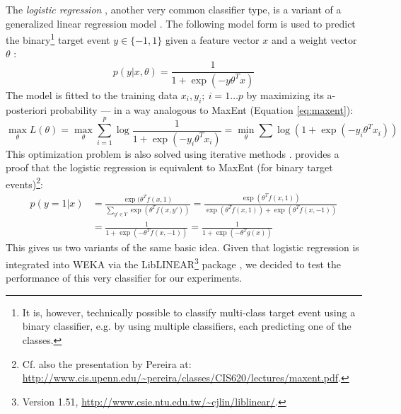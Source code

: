 \documentclass[12pt,notitlepage]{report}
\begin{document}
The \emph{logistic regression} \citep{hosmer00}, another very common classifier type, is a variant of a generalized linear regression model \citep{maccullagh91}. The following model form is used to predict the binary\footnote{It is, however, technically possible to classify multi-class target event using a binary classifier, e.g. by using multiple classifiers, each predicting one of the classes.} target event $y \in\{-1,1\}$ given a feature vector $x$ and a weight vector $\theta$ \citep{lee06}:
\begin{equation}
p(y|x,\theta) = \frac{1}{1 + \exp(-y\theta^T x)}
\end{equation}
The model is fitted to the training data $x_i,y_i;\ i = 1\dots p$ by maximizing its a-posteriori probability --- in a way analogous to MaxEnt (Equation \ref{eq:maxent}):
\begin{equation}\label{eq:logreg}
\max_\theta L(\theta) = \max_\theta \sum_{i=1}^p \log \frac{1}{1 + \exp(-y_i\theta^T x_i)} = \min_\theta \sum\log(1 + \exp(-y_i\theta^T x_i))
\end{equation}
This optimization problem is also solved using iterative methods \citep{fan08}. \citet{blower04} provides a proof that the logistic regression is equivalent to MaxEnt (for binary target events)\footnote{Cf. also the presentation by Pereira at:\\ \url{http://www.cis.upenn.edu/\~pereira/classes/CIS620/lectures/maxent.pdf}.}:
\begin{align}
p(y=1|x) & = \frac{\exp(\theta^T f(x,1)}{\sum_{y'\in Y} \exp(\theta^T f(x,y'))} = \frac{\exp(\theta^T f(x,1))}{\exp(\theta^T f(x,1)) + \exp(\theta^T f(x,-1))} \\
& = \frac{1}{1 + \exp(-\theta^T f(x,-1))} = \frac{1}{1 + \exp(-\theta^T g(x))}
\end{align}
This gives us two variants of the same basic idea. Given that logistic regression is integrated into WEKA via the LibLINEAR\footnote{Version 1.51, \url{http://www.csie.ntu.edu.tw/\~cjlin/liblinear/}.} package \citep{fan08}, we decided to test the performance of this very classifier for our experiments.
\end{document}
